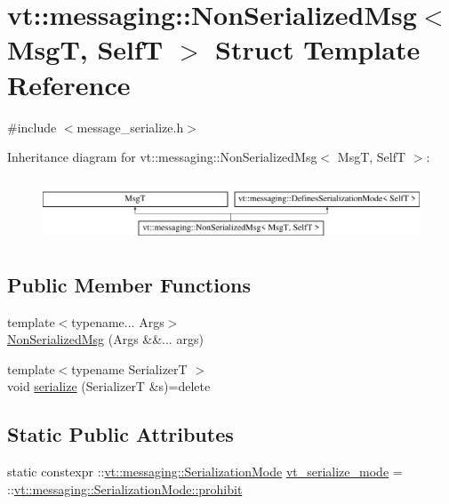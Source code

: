 \hypertarget{structvt_1_1messaging_1_1_non_serialized_msg}{}\section{vt\+:\+:messaging\+:\+:Non\+Serialized\+Msg$<$ MsgT, SelfT $>$ Struct Template Reference}
\label{structvt_1_1messaging_1_1_non_serialized_msg}


{\ttfamily \#include $<$message\+\_\+serialize.\+h$>$}

Inheritance diagram for vt\+:\+:messaging\+:\+:Non\+Serialized\+Msg$<$ MsgT, SelfT $>$\+:\begin{figure}[H]
\begin{center}
\leavevmode
\includegraphics[height=1.879195cm]{structvt_1_1messaging_1_1_non_serialized_msg}
\end{center}
\end{figure}
\subsection*{Public Member Functions}
\begin{DoxyCompactItemize}
\item 
{\footnotesize template$<$typename... Args$>$ }\\\hyperlink{structvt_1_1messaging_1_1_non_serialized_msg_aaaf8f519b382fdad6f9fab8191a2950f}{Non\+Serialized\+Msg} (Args \&\&... args)
\item 
{\footnotesize template$<$typename SerializerT $>$ }\\void \hyperlink{structvt_1_1messaging_1_1_non_serialized_msg_a2598724a040d6b6f1a343d4f2def910d}{serialize} (SerializerT \&s)=delete
\end{DoxyCompactItemize}
\subsection*{Static Public Attributes}
\begin{DoxyCompactItemize}
\item 
static constexpr \+::\hyperlink{namespacevt_1_1messaging_a436c5b9fc7f591e5978a136999cb9ef8}{vt\+::messaging\+::\+Serialization\+Mode} \hyperlink{structvt_1_1messaging_1_1_non_serialized_msg_a51b31c1f6eab5950f3586559c5d27f8a}{vt\+\_\+serialize\+\_\+mode} = \+::\hyperlink{namespacevt_1_1messaging_a436c5b9fc7f591e5978a136999cb9ef8abc56ee21f7c9d61984fde885e8ce116f}{vt\+::messaging\+::\+Serialization\+Mode\+::prohibit}
\end{DoxyCompactItemize}


